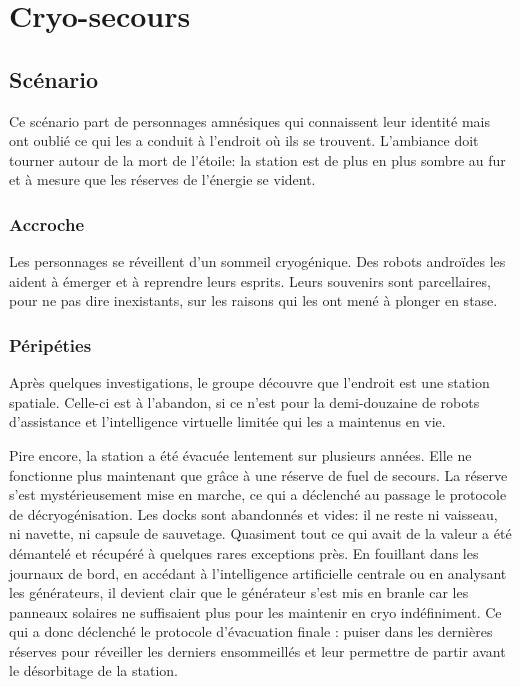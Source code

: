 \chapter{Cryo-secours}

\section{Scénario}

Ce scénario part de personnages amnésiques qui connaissent leur identité mais ont oublié ce qui les a conduit à l'endroit où ils se trouvent.
L'ambiance doit tourner autour de la mort de l'étoile: la station est de plus en plus sombre au fur et à mesure que les réserves de l'énergie se vident.

\subsection{Accroche}

Les personnages se réveillent d'un sommeil cryogénique.
Des robots androïdes les aident à émerger et à reprendre leurs esprits.
Leurs souvenirs sont parcellaires, pour ne pas dire inexistants, sur les raisons qui les ont mené à plonger en stase.

\subsection{Péripéties}

Après quelques investigations, le groupe découvre que l'endroit est une station spatiale.
Celle-ci est à l'abandon, si ce n'est pour la demi-douzaine de robots d'assistance et l'intelligence virtuelle limitée qui les a maintenus en vie.

Pire encore, la station a été évacuée lentement sur plusieurs années.
Elle ne fonctionne plus maintenant que grâce à une réserve de fuel de secours.
La réserve s'est mystérieusement mise en marche, ce qui a déclenché au passage le protocole de décryogénisation.
Les docks sont abandonnés et vides: il ne reste ni vaisseau, ni navette, ni capsule de sauvetage.
Quasiment tout ce qui avait de la valeur a été démantelé et récupéré à quelques rares exceptions près.
En fouillant dans les journaux de bord, en accédant à l'intelligence artificielle centrale ou en analysant les générateurs, il devient clair que le générateur s'est mis en branle car les panneaux solaires ne suffisaient plus pour les maintenir en cryo indéfiniment.
Ce qui a donc déclenché le protocole d'évacuation finale : puiser dans les dernières réserves pour réveiller les derniers ensommeillés et leur permettre de partir avant le désorbitage de la station.

